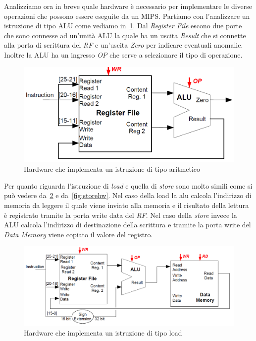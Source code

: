 Analizziamo ora in breve quale hardware è necessario per implementare le diverse operazioni che possono essere eseguite da un MIPS. Partiamo con l'analizzare un istruzione di tipo ALU come vediamo in \figurename\,\ref{fig:ALUhw}. Dal \emph{Register File} escono due porte che sono connesse ad un'unità ALU la quale ha un uscita \emph{Result} che si connette alla porta di scrittura del \emph{RF} e un'uscita \emph{Zero} per indicare eventuali anomalie. Inoltre la ALU ha un ingresso \emph{OP} che serve a selezionare il tipo di operazione.
\begin{figure}[htb]
\centering
\includegraphics[scale=0.4]{img/aluhw.png}
\caption{Hardware che implementa un istruzione di tipo aritmetico}\label{fig:ALUhw}
\end{figure}
Per quanto riguarda l'istruzione di \emph{load} e quella di \emph{store} sono molto simili come si può vedere da \figurename\,\ref{fig:loadhw} e da \figurename\,\ref{fig:storehw}. Nel caso della load la alu calcola l'indirizzo di memoria da leggere il quale viene inviato alla memoria e il risultato della lettura è registrato tramite la porta write data del \emph{RF}. Nel caso della \emph{store} invece la ALU calcola l'indirizzo di destinazione della scrittura e tramite la porta write del \emph{Data Memory} viene copiato il valore del registro.
\begin{figure}[htb]
\centering
\includegraphics[scale=0.45]{img/loadhw.png}
\caption{Hardware che implementa un istruzione di tipo load}\label{fig:loadhw}
\end{figure}
